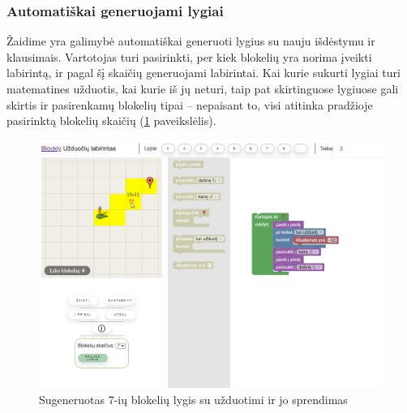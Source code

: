 \documentclass{VUMIFPSkursinis}
\begin{document}
\subsubsection{Automatiškai generuojami lygiai}

Žaidime yra galimybė automatiškai generuoti lygius su nauju išdėstymu ir klausimais. Vartotojas turi pasirinkti, per kiek blokelių yra norima įveikti labirintą, ir pagal šį skaičių generuojami labirintai. Kai kurie sukurti lygiai turi matematines užduotis, kai kurie iš jų neturi, taip pat skirtinguose lygiuose gali skirtis ir pasirenkamų blokelių tipai -- nepaisant to, visi atitinka pradžioje pasirinktą blokelių skaičių (\ref{img:randomLevelGame} paveikslėlis).

\begin{figure}[H]
\centering
\includegraphics[scale=0.4]{img/randomLevelGame.png}
\caption{Sugeneruotas 7-ių blokelių lygis su užduotimi ir jo sprendimas}
\label{img:randomLevelGame}
\end{figure}
\end{document}
